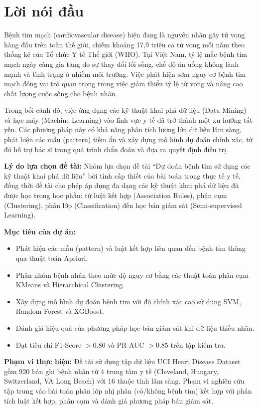 \chapter*{Lời nói đầu}

Bệnh tim mạch (cardiovascular disease) hiện đang là nguyên nhân gây tử vong hàng đầu trên toàn thế giới, chiếm khoảng 17,9 triệu ca tử vong mỗi năm theo thống kê của Tổ chức Y tế Thế giới (WHO). Tại Việt Nam, tỷ lệ mắc bệnh tim mạch ngày càng gia tăng do sự thay đổi lối sống, chế độ ăn uống không lành mạnh và tình trạng ô nhiễm môi trường. Việc phát hiện sớm nguy cơ bệnh tim mạch đóng vai trò quan trọng trong việc giảm thiểu tỷ lệ tử vong và nâng cao chất lượng cuộc sống cho bệnh nhân.

Trong bối cảnh đó, việc ứng dụng các kỹ thuật khai phá dữ liệu (Data Mining) và học máy (Machine Learning) vào lĩnh vực y tế đã trở thành một xu hướng tất yếu. Các phương pháp này có khả năng phân tích lượng lớn dữ liệu lâm sàng, phát hiện các mẫu (pattern) tiềm ẩn và xây dựng mô hình dự đoán chính xác, từ đó hỗ trợ bác sĩ trong quá trình chẩn đoán và đưa ra quyết định điều trị.

\textbf{Lý do lựa chọn đề tài:} Nhóm lựa chọn đề tài ``Dự đoán bệnh tim sử dụng các kỹ thuật khai phá dữ liệu'' bởi tính cấp thiết của bài toán trong thực tế y tế, đồng thời đề tài cho phép áp dụng đa dạng các kỹ thuật khai phá dữ liệu đã được học trong học phần: từ luật kết hợp (Association Rules), phân cụm (Clustering), phân lớp (Classification) đến học bán giám sát (Semi-supervised Learning).

\textbf{Mục tiêu của dự án:}
\begin{itemize}
    \item Phát hiện các mẫu (pattern) và luật kết hợp liên quan đến bệnh tim thông qua thuật toán Apriori.
    \item Phân nhóm bệnh nhân theo mức độ nguy cơ bằng các thuật toán phân cụm KMeans và Hierarchical Clustering.
    \item Xây dựng mô hình dự đoán bệnh tim với độ chính xác cao sử dụng SVM, Random Forest và XGBoost.
    \item Đánh giá hiệu quả của phương pháp học bán giám sát khi dữ liệu thiếu nhãn.
    \item Đạt tiêu chí F1-Score $> 0.80$ và PR-AUC $> 0.85$ trên tập kiểm tra.
\end{itemize}

\textbf{Phạm vi thực hiện:} Đề tài sử dụng tập dữ liệu UCI Heart Disease Dataset gồm 920 bản ghi bệnh nhân từ 4 trung tâm y tế (Cleveland, Hungary, Switzerland, VA Long Beach) với 16 thuộc tính lâm sàng. Phạm vi nghiên cứu tập trung vào bài toán phân lớp nhị phân (có/không bệnh tim) kết hợp với phân tích luật kết hợp, phân cụm và đánh giá phương pháp bán giám sát.

